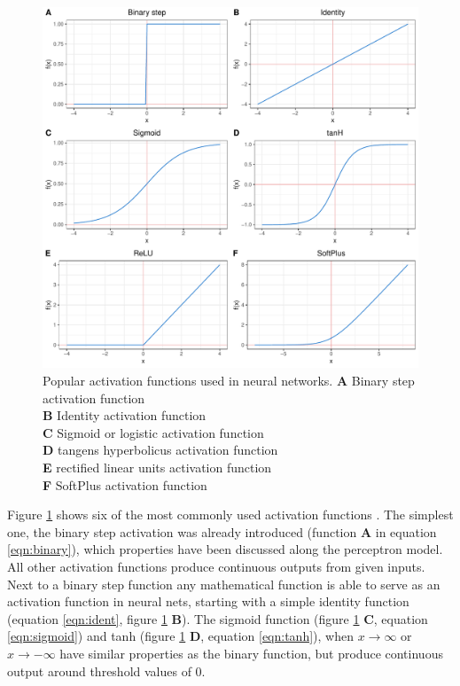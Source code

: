 \begin{figure}[H]
\centering
\includegraphics[height=.55\textheight, width=.85\textwidth]{Figures/activation}
\decoRule
\caption[Popular activation functions for neural networks]{Popular activation functions used in
  neural networks.
  \textbf{A} Binary step activation function \\
  \textbf{B} Identity activation function \\
  \textbf{C} Sigmoid or logistic activation function \\
  \textbf{D} tangens hyperbolicus activation function \\
  \textbf{E} rectified linear units activation function \\
  \textbf{F} SoftPlus activation function\\}
\label{fig:activation}
\end{figure}


Figure \ref{fig:activation} shows six of the most commonly used activation functions
\cite{warner1996understanding}. The simplest one, the binary step activation was already
introduced (function \textbf{A} in equation \ref{eqn:binary}), which properties have been
discussed along the perceptron model. All other activation functions produce continuous outputs from given inputs. \\
Next to a binary step function any mathematical function is able to serve as an activation
function in neural nets, starting with a simple identity function (equation
\ref{eqn:ident}, figure \ref{fig:activation} \textbf{B}). The sigmoid function (figure
\ref{fig:activation} \textbf{C}, equation \ref{eqn:sigmoid}) and tanh (figure
\ref{fig:activation} \textbf{D}, equation \ref{eqn:tanh}), when $x \rightarrow \infty$ or
$x \rightarrow -\infty$ have similar properties as the binary function, but produce
continuous output around threshold values of 0.

